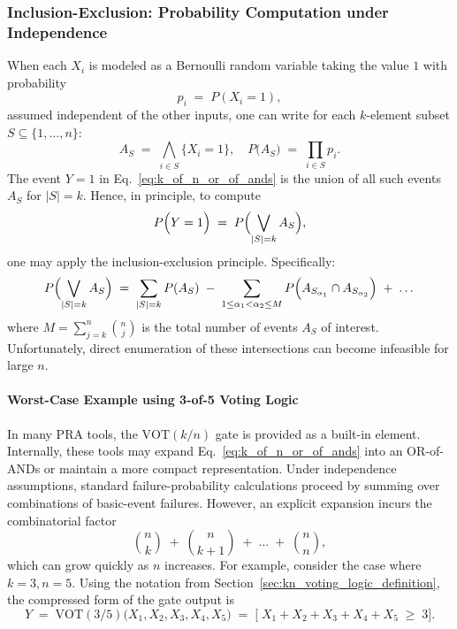 \subsubsection{Inclusion-Exclusion: Probability Computation under Independence}
When each \(X_i\) is modeled as a Bernoulli random variable taking the value \(1\) with probability
\[
p_i \;=\; P(X_i = 1),
\]
assumed independent of the other inputs, one can write for each \(k\)-element subset \(S \subseteq \{1,\ldots,n\}\):
\[
A_S \;=\;\bigwedge_{i \in S} \{X_i = 1\},
\quad
P\bigl(A_S\bigr) 
\;=\;
\prod_{i \in S} p_i.
\]
The event \(Y=1\) in Eq.~\eqref{eq:k_of_n_or_of_ands} is the union of all such events \(A_S\) for \(\lvert S\rvert = k\). Hence, in principle, to compute
\[
P\Bigl(Y = 1\Bigr)
\;=\;
P\Bigl(\bigvee_{\lvert S\rvert = k} A_S\Bigr),
\]
one may apply the inclusion-exclusion principle. Specifically:
\begin{equation}
\label{eq:union_inclusion_exclusion}
P\Bigl(\bigvee_{\lvert S\rvert = k} A_S\Bigr)
\;=\;
\sum_{\lvert S\rvert=k}P(A_S)
\;-\;\sum_{1\le \alpha_1<\alpha_2\le M}P\Bigl(A_{S_{\alpha_1}}\cap A_{S_{\alpha_2}}\Bigr)
\;+\;\dots
\end{equation}
where \(M=\sum_{j=k}^{n} \binom{n}{j}\) is the total number of events \(A_S\) of interest. Unfortunately, direct enumeration of these intersections can become infeasible for large \(n\).

\paragraph{Worst-Case Example using 3-of-5 Voting Logic}
\label{sec:3_of_5_voting_logic_example}

In many PRA tools, the \(\mathrm{VOT}(k/n)\) gate is provided as a built-in element. Internally, these tools may expand Eq.~\eqref{eq:k_of_n_or_of_ands} into an OR-of-ANDs or maintain a more compact representation. Under independence assumptions, standard failure-probability calculations proceed by summing over combinations of basic-event failures. However, an explicit expansion incurs the combinatorial factor
\[
\binom{n}{k} \;+\; \binom{n}{k+1} \;+\; \dots \;+\; \binom{n}{n},
\]
which can grow quickly as \(n\) increases. For example, consider the case where $k=3, n=5$. Using the notation from Section~\ref{sec:kn_voting_logic_definition}, the compressed form of the gate output is
\[
Y \;=\; \mathrm{VOT}(3/5)\bigl(X_1, X_2, X_3, X_4, X_5\bigr)
\;=\;
\bigl[\;X_1 + X_2 + X_3 + X_4 + X_5 \;\ge\; 3\bigr].
\]



